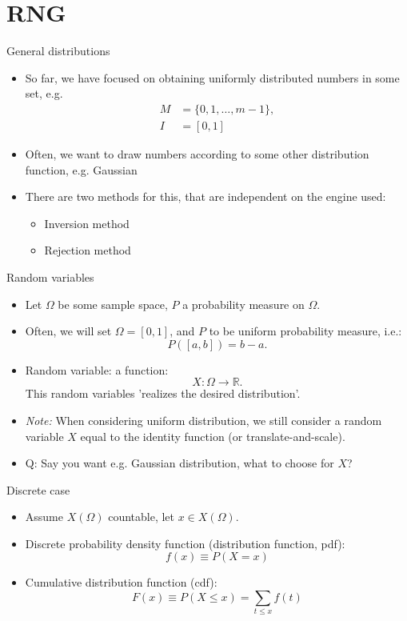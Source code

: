\documentclass[10pt]{beamer}
\begin{document}
\section{RNG}
\label{sec:orgfef6b6f}
\begin{frame}[label={sec:org887fefd}]{General distributions}
\begin{itemize}
\item So far, we have focused on obtaining uniformly distributed numbers in some
set, e.g.
\begin{align*}
M &= \{ 0, 1, \ldots, m - 1 \}, \\
I &= [0, 1]
\end{align*}
\item Often, we want to draw numbers according to some other distribution function,
e.g. \alert{Gaussian}
\item There are two methods for this, that are independent on the engine used:
\begin{itemize}
\item \alert{Inversion} method
\item \alert{Rejection} method
\end{itemize}
\end{itemize}
\end{frame}
\begin{frame}[label={sec:org359bb4b}]{Random variables}
\begin{itemize}
\item Let \(\Omega\) be some \alert{sample space}, \(P\) a \alert{probability measure} on \(\Omega\).
\item Often, we will set \(\Omega = [0, 1]\), and \(P\) to be \alert{uniform probability measure}, i.e.:
$$P([a, b]) = b - a.$$
\item Random variable: a function:
$$X: \Omega \to \mathbb{R}.$$
This random variables 'realizes the desired distribution'.
\item \emph{Note:} When considering uniform distribution, we still consider a random variable \(X\) equal to the identity function (or translate-and-scale).
\item \alert{\alert{Q:}} Say you want e.g. Gaussian distribution, what to choose for \(X\)?
\end{itemize}
\end{frame}
\begin{frame}[label={sec:orgb17bbb8}]{Discrete case}
\begin{itemize}
\item Assume \(X(\Omega)\) countable, let \(x \in X(\Omega)\).
\item Discrete \alert{probability density function} (distribution function, pdf):
$$f(x) \equiv P(X = x)$$
\item \alert{Cumulative distribution function} (cdf):
$$F(x) \equiv P(X \leq x) = \sum_{t \leq x} f(t)$$
\end{itemize}
\end{frame}
\end{document}
